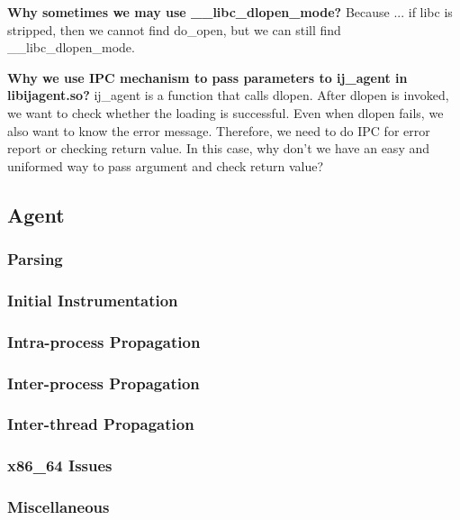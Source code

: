 \textbf{Why sometimes we may use \_\_libc\_dlopen\_mode?} Because ... if libc is
stripped, then we cannot find do\_open, but we can still find
\_\_libc\_dlopen\_mode.


\textbf{Why we use IPC mechanism to pass parameters to ij\_agent in
  libijagent.so?}  ij\_agent is a function that calls dlopen. After dlopen is
invoked, we want to check whether the loading is successful. Even when dlopen
fails, we also want to know the error message. Therefore, we need to do IPC for
error report or checking return value. In this case, why don't we have an easy
and uniformed way to pass argument and check return value?

\subsection{Agent}
\subsubsection{Parsing}
\subsubsection{Initial Instrumentation}
\subsubsection{Intra-process Propagation} \label{sec:intrainst}
\subsubsection{Inter-process Propagation}
\subsubsection{Inter-thread Propagation}
\subsubsection{x86\_64 Issues}

\subsubsection{Miscellaneous}

